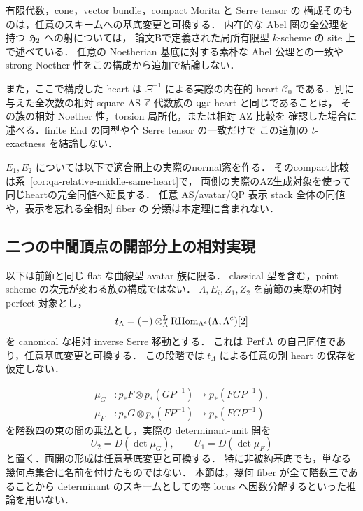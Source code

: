 \begin{remark}[基底とheartの比較範囲]
有限代数，cone，vector bundle，compact Morita と Serre tensor の
構成そのものは，任意のスキームへの基底変更と可換する．
内在的な Abel 圏の全公理を持つ $\mathfrak H_2$ への射については，
論文Bで定義された局所有限型 $k$-scheme の site 上で述べている．
任意の Noetherian 基底に対する素朴な Abel 公理との一致や
strong Noether 性をこの構成から追加で結論しない．

また，ここで構成した heart は $\Xi^{-1}$ による実際の内在的 heart
$\mathcal C_0$ である．別に与えた全次数の相対 square AS
$\mathbb Z$-代数族の $\operatorname{qgr}$ heart と同じであることは，
その族の相対 Noether 性，torsion 局所化，または相対 AZ 比較を
確認した場合に述べる．finite End の同型や全 Serre tensor の一致だけで
この追加の $t$-exactness を結論しない．

$E_1,E_2$ については以下で適合開上の実際のnormal窓を作る．
そのcompact比較は系~\ref{cor:qa-relative-middle-same-heart}で，
両側の実際のAZ生成対象を使って同じheartの完全同値へ延長する．
任意 AS/avatar/QP 表示 stack 全体の同値や，表示を忘れる全相対 fiber の
分類は本定理に含まれない．
\end{remark}

\subsection{二つの中間頂点の開部分上の相対実現}
\label{subsec:qa-relative-middle-pointings}

以下は前節と同じ flat な曲線型 avatar 族に限る．
classical 型を含む，point scheme の次元が変わる族の構成ではない．
$\Lambda,E_i,Z_1,Z_2$ を前節の実際の相対 perfect 対象とし，
\[
 t_\Lambda=(-)\otimes_\Lambda^{\mathbf L}
          \operatorname{RHom}_{\Lambda^e}(\Lambda,\Lambda^e)[2]
\]
を canonical な相対 inverse Serre 移動とする．
これは $\operatorname{Perf}\Lambda$ の自己同値であり，任意基底変更と可換する．
この段階では $t_\Lambda$ による任意の別 heart の保存を仮定しない．

\[
 \begin{split}
 \mu_G &:p_*F\otimes p_*(GP^{-1})\longrightarrow p_*(FGP^{-1}),\\
 \mu_F &:p_*G\otimes p_*(FP^{-1})\longrightarrow p_*(FGP^{-1})
 \end{split}
\]
を階数四の束の間の乗法とし，実際の determinant-unit 開を
\[
 U_2=D(\det\mu_G),\qquad U_1=D(\det\mu_F)
\]
と置く．両開の形成は任意基底変更と可換する．
特に非被約基底でも，単なる幾何点集合に名前を付けたものではない．
本節は，幾何 fiber が全て階数三であることから
determinant のスキームとしての零 locus へ因数分解するといった推論を用いない．

